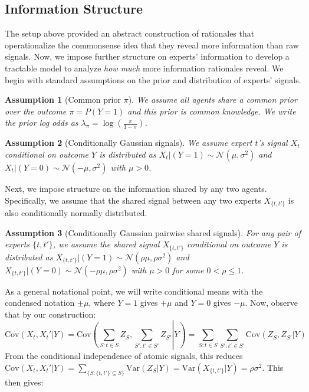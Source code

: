 \documentclass{winnower}
\newtheorem{assumption}{Assumption}
\begin{document}
\subsection{Information Structure}
The setup above provided an abstract construction of rationales that operationalize the commonsense idea that they reveal more information than raw signals. Now, we impose further structure on experts' information to develop a tractable model to analyze \emph{how much} more information rationales reveal. We begin with standard assumptions on the prior and distribution of experts' signals.

\begin{assumption}[Common prior $\pi$]
    We assume all agents share a common prior over the outcome $\pi = P(Y=1)$ and this prior is common knowledge. We write the prior log odds as $\lambda_\pi = \log\left(\frac{\pi}{1-\pi}\right)$.
\end{assumption}
 

\begin{assumption}[Conditionally Gaussian signals]
    We assume expert $t$'s signal $X_t$ conditional on outcome $Y$ is distributed as $X_t|(Y=1) \sim \mathcal{N}(\mu, \sigma^2)$ and $X_t|(Y=0) \sim \mathcal{N}(-\mu, \sigma^2)$ with $\mu > 0$.
\end{assumption}

Next, we impose structure on the information shared by any two agents. Specifically, we assume that the shared signal between any two experts $X_{\{t, t'\}}$ is also conditionally normally distributed.

\begin{assumption}[Conditionally Gaussian pairwise shared signals]
    For any pair of experts $\{t, t'\}$, we assume the shared signal $X_{\{t, t'\}}$ conditional on outcome $Y$ is distributed as $X_{\{t, t'\}}|(Y=1) \sim \mathcal{N}(\rho\mu, \rho\sigma^2)$ and $X_{\{t, t'\}}|(Y=0) \sim \mathcal{N}(-\rho\mu, \rho\sigma^2)$ with $\mu > 0$ for some $0 < \rho \leq 1$.
\end{assumption}

As a general notational point, we will write conditional means with the condensed notation $\pm \mu$, where $Y=1$ gives $+\mu$ and $Y=0$ gives $-\mu$. Now, observe that by our construction:
{\small
\begin{equation}
    \text{Cov}(X_t, X_t' | Y) = \text{Cov}\left(\sum_{S:t \in S} Z_S, \sum_{S':t' \in S'} Z_{S'} \left.\right| Y\right) = \sum_{S: t \in S}\sum_{S': t' \in S'} \text{Cov}\left(Z_S, Z_{S'} | Y \right)
\end{equation}
}
From the conditional independence of atomic signals, this reduces $\text{Cov}(X_t, X_t' | Y) = \sum_{\{S: \{t, t'\} \subseteq S\}} \text{Var}\left(Z_S | Y\right) = \text{Var}\left(X_{\{t, t'\}} | Y\right) = \rho\sigma^2$. This then gives:
\end{document}
